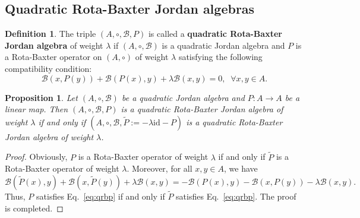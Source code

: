 \documentclass[12pt, reqno, a4paper]{amsart}
\newtheorem{proposition}[theorem]{Proposition}
\theoremstyle{definition}
\newtheorem{definition}[theorem]{Definition}
\newcommand{\id}{\mathrm{id}}
\begin{document}
\subsection{Quadratic Rota-Baxter Jordan algebras}

\begin{definition}
	The triple $(A, \circ, \mathcal{B}, P)$ is called a \textbf{quadratic Rota-Baxter Jordan algebra} of weight $\lambda$ if $(A, \circ, \mathcal{B})$ is a quadratic Jordan algebra and $P$ is a Rota-Baxter operator on $(A, \circ )$ of weight $\lambda$ satisfying the following compatibility condition:
	\begin{equation}
		\mathcal{B}(x, P(y)) + \mathcal{B}(P(x), y) + \lambda \mathcal{B}(x, y) = 0, \;\; \forall x, y \in A. \label{eq:qrbp}
	\end{equation}
\end{definition}


\begin{proposition}\label{prop:PandtauP}
	Let $( A, \circ, \mathcal{B})$ be a quadratic Jordan algebra and $P: A \to A$ be a linear map. Then $( A, \circ, \mathcal{B}, P)$ is a quadratic Rota-Baxter Jordan algebra of weight $\lambda$ if and only if $( A, \circ, \mathcal{B}, \tilde{P} := - \lambda \id - P)$ is a quadratic Rota-Baxter Jordan algebra of weight $\lambda$.
\end{proposition}
\begin{proof}
	Obviously, $P$ is a Rota-Baxter operator of weight $\lambda$ if and only if $\tilde{P}$ is a Rota-Baxter operator of weight $\lambda$.
	Moreover, for all $x, y \in A$, we have
	\begin{equation*}
		\mathcal{B}(\tilde{P}(x), y)+\mathcal{B}(x,\tilde{P}(y))+\lambda \mathcal{B}(x, y)=-\mathcal{B}(P(x), y)-\mathcal{B}(x, P(y))-\lambda \mathcal{B}(x, y).
	\end{equation*}
	Thus, $P$ satisfies Eq.~\eqref{eq:qrbp} if and only if $\tilde{P}$ satisfies Eq.~\eqref{eq:qrbp}.
	The proof is completed.
\end{proof}
\end{document}
